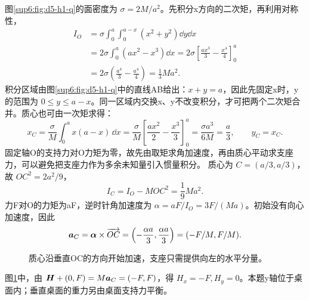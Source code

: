 \begin{solution}
图\ref{sup6:fig:d5-h1-q}的面密度为 $\sigma=2M/a^2$。先积分x方向的二次矩，再利用对称性，
\[
\begin{aligned}
I_O&=\sigma\int_0^a\int_0^{a-x}(x^2+y^2)\dd y\dd x\\
&=2\sigma\int_0^a(ax^2-x^3)\dd x
=2\sigma\left[\frac{ax^3}{3}-\frac{x^4}{4}\right]_0^a\\
&=2\sigma\left(\frac{a^4}3-\frac{a^4}4\right)=\frac13Ma^2.
\end{aligned}
\]
积分区域由图\ref{sup6:fig:d5-h1-q}中的直线AB给出：$x+y=a$，因此先固定x时，y的范围为 $0\le y\le a-x$。同一区域内交换x、y不改变积分，才可把两个二次矩合并。质心也可由一次矩求得：
\[
x_C=\frac{\sigma}{M}\int_0^a x(a-x)\,\dd x
=\frac{\sigma}{M}\left[\frac{ax^2}{2}-\frac{x^3}{3}\right]_0^a
=\frac{\sigma a^3}{6M}=\frac a3,
\qquad y_C=x_C.
\]
固定轴O的支持力对O力矩为零，故先由取矩求角加速度，再由质心平动求支座力，可以避免把支座力作为多余未知量引入惯量积分。
质心为 $C=(a/3,a/3)$，故 $OC^2=2a^2/9$，
\[
I_C=I_O-MOC^2=\frac19Ma^2.
\]
力F对O的力矩为aF，逆时针角加速度为 $\alpha=aF/I_O=3F/(Ma)$。初始没有向心加速度，因此
\[
\bm{a}_C=\bm{\alpha}\times\overrightarrow{OC}
=\left(-\frac{\alpha a}3,\frac{\alpha a}3\right)
=(-F/M,F/M).
\]
\begin{figure}[H]\centering
{}
\caption{质心沿垂直OC的方向开始加速，支座只需提供向左的水平分量。}\label{sup6:fig:d5-h1-s}
\end{figure}
图\ref{sup6:fig:d5-h1-s}中，由 $\bm{H}+(0,F)=M\bm{a}_C=(-F,F)$，得 $H_x=-F,H_y=0$。本题y轴位于桌面内；垂直桌面的重力另由桌面支持力平衡。
\end{solution}


